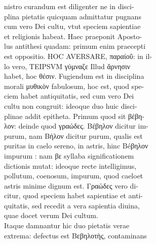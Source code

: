 \documentclass{article}
\begin{document}
\begin{pages}
                nistro curandum est diligenter ne in disci- \\
                plina pietatis quicquam admittatur pugnans \\
                cum vero Dei cultu, vtut speciem sapientiae \\
                et religionis habeat. Haec praeponit Aposto- \\
                lus antithesi quadam: primum enim praecepti \\
                est oppositio. HOC AVERSARE, παραίοῦ: in il- \\
                lo vero, TEIPSVM γύμναζε Illud ἄρνησιν \\
                habet, hoc θέσιν. Fugiendum est in disciplina \\
                morali μυθικὸν fabulosum, hoc est, quod spe- \\
                ciem habet antiquitatis, sed cum vero Dei \\
                cultu non congruit: ideoque duo huic disci- \\
                plinae addit epitheta. Primum quod sit βέβη- \\
                λον: deinde quod γραώδες. Βέβηλον dicitur im- \\
                purum, nam Βήλον dicitur purum, qualis est \\
                puritas in caelo sereno, in astris, hinc Béβηλον \\
                impurum : nam βε syllaba significationem \\
                dictionis mutat: ideoque recte intelligimus, \\
                pollutum, coenosum, impurum, quod caeloet \\
                astris minime dignum est. Γραώδες vero di- \\
                citur, quod speciem habet sapientiae et anti- \\
                quitatis, sed recedit a vera sapientia diuina, \\
                quae docet verum Dei cultum. \\
                Itaque damnantur hic duo pietatis verae \\
                extrema: defectus est Bεβηλοτὴς, contaminans \\

\end{pages}
\end{document}
